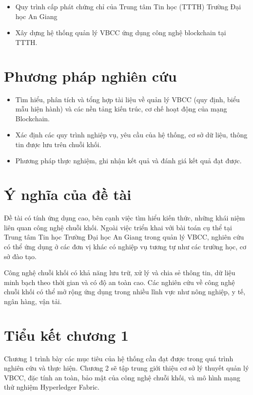 \begin{itemize}
\item Quy trình cấp phát chứng chỉ của Trung tâm Tin học (TTTH) Trường Đại học An Giang
\item Xây dựng hệ thống quản lý VBCC ứng dụng công nghệ blockchain tại TTTH.
\end{itemize}

\section{Phương pháp nghiên cứu}

\begin{itemize}
\item Tìm hiểu, phân tích và tổng hợp tài liệu về quản lý VBCC (quy định, biểu mẫu hiện hành) và các nền tảng kiến trúc, cơ chế hoạt động của mạng Blockchain.
\item Xác định các quy trình nghiệp vụ, yêu cầu của hệ thống, cơ sở dữ liệu, thông tin được lưu trên chuỗi khối.
\item Phương pháp thực nghiệm, ghi nhận kết quả và đánh giá kết quả đạt được.
\end{itemize}
\section{Ý nghĩa của đề tài}

Đề tài có tính ứng dụng cao, bên cạnh việc tìm hiểu kiến thức, những khái niệm liên quan công nghệ chuỗi khối.
Ngoài việc triển khai với bài toán cụ thể tại Trung tâm Tin học Trường Đại học An Giang trong quản lý VBCC, nghiên cứu có thể ứng dụng ở các đơn vị khác có nghiệp vụ tương tự như các trường học, cơ sở đào tạo.

Công nghệ chuỗi khối có khả năng lưu trữ, xử lý và chia sẻ thông tin, dữ liệu minh bạch theo thời gian và có độ an toàn cao. Các nghiên cứu về công nghệ chuỗi khối có thể mở rộng ứng dụng trong nhiều lĩnh vực như nông nghiệp, y tế, ngân hàng, vận tải.
\section{Tiểu kết chương 1}

Chương 1 trình bày các mục tiêu của hệ thống cần đạt được trong quá trình nghiên cứu và thực hiện. Chương 2 sẽ tập trung giới thiệu cơ sở lý thuyết quản lý VBCC, đặc tính an toàn, bảo mật của công nghệ chuỗi khối, và mô hình mạng thử nghiệm Hyperledger Fabric.
